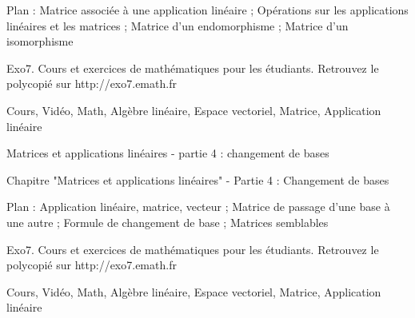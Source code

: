 Plan : Matrice associée à une application linéaire ; 
Opérations sur les applications linéaires et les matrices ;
Matrice d'un endomorphisme ; Matrice d'un isomorphisme


Exo7. Cours et exercices de mathématiques pour les étudiants.
Retrouvez le polycopié sur http://exo7.emath.fr


Cours, Vidéo, Math, Algèbre linéaire, Espace vectoriel, Matrice, Application linéaire





Matrices et applications linéaires - partie 4 : changement de bases



Chapitre "Matrices et applications linéaires" - Partie 4 : Changement de bases

Plan : Application linéaire, matrice, vecteur ; 
Matrice de passage d'une base à une autre ;
Formule de changement de base ; Matrices semblables

Exo7. Cours et exercices de mathématiques pour les étudiants.
Retrouvez le polycopié sur http://exo7.emath.fr


Cours, Vidéo, Math, Algèbre linéaire, Espace vectoriel, Matrice, Application linéaire


